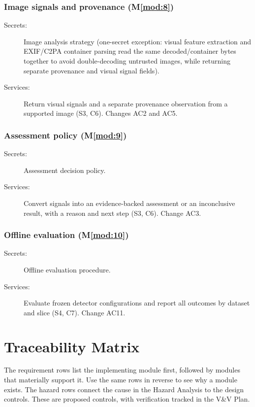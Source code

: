 \documentclass[12pt, titlepage]{article}
\newcommand{\mref}[1]{M\ref{#1}}
\newcommand{\modref}[1]{\mref{mod:#1}}
\begin{document}
\subsubsection{Image signals and provenance (\modref{8})}

\begin{description}
\item[Secrets:] Image analysis strategy (one-secret exception: visual feature extraction and EXIF/C2PA container parsing read the same decoded/container bytes together to avoid double-decoding untrusted images, while returning separate provenance and visual signal fields).
\item[Services:] Return visual signals and a separate provenance observation from a supported image (S3, C6). Changes AC2 and AC5.
\end{description}

\subsubsection{Assessment policy (\modref{9})}

\begin{description}
\item[Secrets:] Assessment decision policy.
\item[Services:] Convert signals into an evidence-backed assessment or an inconclusive result, with a reason and next step (S3, C6). Change AC3.
\end{description}

\subsubsection{Offline evaluation (\modref{10})}

\begin{description}
\item[Secrets:] Offline evaluation procedure.
\item[Services:] Evaluate frozen detector configurations and report all outcomes by dataset and slice (S4, C7). Change AC11.
\end{description}

\section{Traceability Matrix} \label{SecTM}

The requirement rows list the implementing module first, followed by modules that materially support it. Use the same rows in reverse to see why a module exists. The hazard rows connect the cause in the Hazard Analysis to the design controls. These are proposed controls, with verification tracked in the V\&V Plan.
\end{document}
